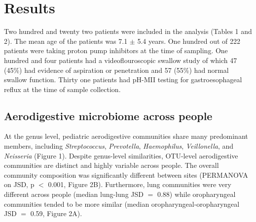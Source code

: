 \documentclass{article}
\begin{document}
\section{Results}

Two hundred and twenty two patients were included in the analysis (Tables 1 and 2). 
The mean age of the patients was 7.1 $\pm$ 5.4 years. 
One hundred out of 222 patients were taking proton pump inhibitors at the time of sampling. 
One hundred and four patients had a videoflouroscopic swallow study of which 47 (45\%) had evidence of aspiration or penetration and 57 (55\%) had normal swallow function. 
Thirty one patients had pH-MII testing for gastroesophageal reflux at the time of sample collection.

\subsection{Aerodigestive microbiome across people}

At the genus level, pediatric aerodigestive communities share many predominant members, including \textit{Streptococcus}, \textit{Prevotella}, \textit{Haemophilus}, \textit{Veillonella}, and \textit{Neisseria} (Figure 1).
Despite genus-level similarities, OTU-level aerodigestive communities are distinct and highly variable across people.
The overall community composition was significantly different between sites (PERMANOVA on JSD, p $<$ 0.001, Figure 2B).
Furthermore, lung communities were very different across people (median lung-lung JSD $=$ 0.88) while oropharyngeal communities tended to be more similar (median oropharyngeal-oropharyngeal JSD $=$ 0.59, Figure 2A).


\end{document}
